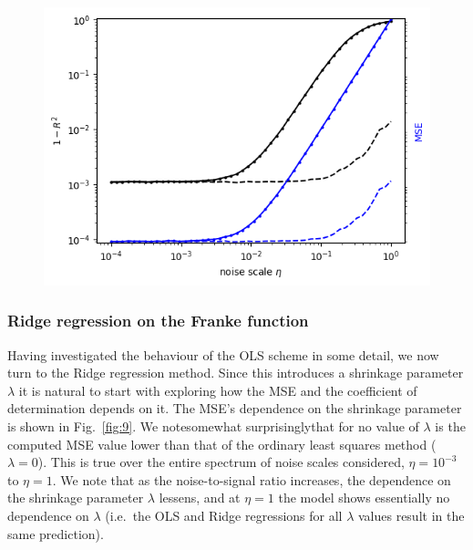 \documentclass[a4paper, twocolumn]{article}
\newcommand{\fig}[1]{Fig.\ \ref{fig:#1}}
\begin{document}
\begin{figure}
\centering
\includegraphics[width=\linewidth]{R2MSE_OLS_noise.png}
\end{figure}



\subsubsection{Ridge regression on the Franke function}
Having investigated the behaviour of the OLS scheme in some detail, we now turn to the Ridge regression method. Since this introduces a shrinkage parameter $\lambda$ it is natural to start with exploring how the MSE and the coefficient of determination depends on it. The MSE's dependence on the shrinkage parameter is shown in \fig{9}. We note\textemdash somewhat surprisingly\textemdash that for no value of $\lambda$ is the computed MSE value lower than that of the ordinary least squares method ($\lambda=0$). This is true over the entire spectrum of noise scales considered, $\eta=10^{-3}$ to $\eta=1$. We note that as the noise-to-signal ratio increases, the dependence on the shrinkage parameter $\lambda$ lessens, and at $\eta=1$ the model shows essentially no dependence on $\lambda$ (i.e.\ the OLS and Ridge regressions for all $\lambda$ values result in the same prediction).
\end{document}
